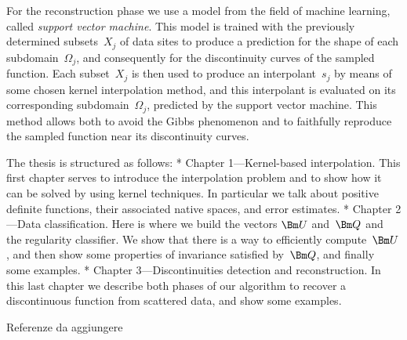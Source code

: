 For the reconstruction phase we use a model from the field of machine learning, called {\em support vector machine}.
This model is trained with the  previously determined subsets~$X_j$ of data sites to produce a prediction for the shape of each subdomain~$Ω_j$, and consequently for the discontinuity curves of the sampled function.  Each subset~$X_j$ is then used to produce an interpolant~$s_j$ by means of some chosen kernel interpolation method, and this interpolant is evaluated on its corresponding subdomain~$Ω_j$, predicted by the support vector machine.  This method allows  both to avoid the Gibbs phenomenon and to faithfully reproduce the sampled function near its discontinuity curves.



The thesis is structured as follows:
\begitems
* Chapter 1---Kernel-based interpolation.  This first chapter serves to introduce the interpolation problem and to show how it can be solved by using kernel techniques. In particular we talk about positive definite functions, their associated native spaces, and error estimates.
* Chapter 2---Data classification.  Here is where we build the vectors $\Bm U$ and~$\Bm Q$ and the regularity classifier.  We show that there is a way to efficiently compute~$\Bm U$, and then show some properties of invariance satisfied by~$\Bm Q$, and finally some examples.
* Chapter 3---Discontinuities detection and reconstruction. In this last chapter we describe both phases of our algorithm to recover a discontinuous function from scattered data, and show some examples.
\enditems








\Red

Referenze da aggiungere

\Black
